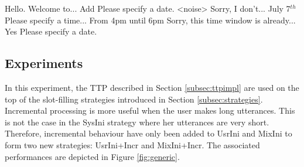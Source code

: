          \begin{dialogue}
            Hello. Welcome to...
            Add
            Please specify a date.
            <noise>
            Sorry, I don't...
            July 7$^{th}$
            Please specify a time...
            From 4pm until 6pm
            Sorry, this time window is already...
            Yes
            Please specify a date.
         \end{dialogue}
    
    \subsection{Experiments}
    
    	In this experiment, the TTP described in Section \ref{subsec:ttpimpl} are used on the top of the slot-filling strategies introduced in Section \ref{subsec:strategies}. Incremental processing is more useful when the user makes long utterances. This is not the case in the SysIni strategy where her utterances are very short. Therefore, incremental behaviour have only been added to UsrIni and MixIni to form two new strategies: UsrIni+Incr and MixIni+Incr. The associated performances are depicted in Figure \ref{fig:generic}.

